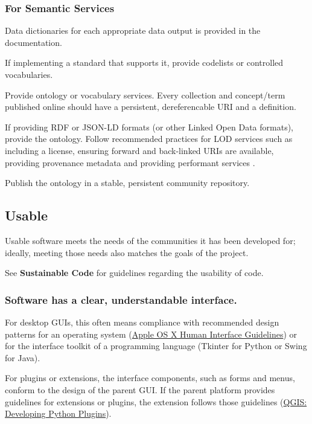 \documentclass{article}
\newcounter{subsubsubsection}[subsubsection]
\begin{document}
\subsubsection{For Semantic Services}
Data dictionaries for each appropriate data output is provided in the documentation.
 
If implementing a standard that supports it, provide codelists or controlled vocabularies.
 
Provide ontology or vocabulary services. Every collection and concept/term published online should have a persistent, dereferencable URI and a definition.
 
If providing RDF or JSON-LD formats (or other Linked Open Data formats), provide the ontology. Follow recommended practices for LOD services such as including a license, ensuring forward and back-linked URIs are available, providing provenance metadata and providing performant services \autocite{zaveri_quality_2015}.
 
Publish the ontology in a stable, persistent community repository.

\subsection{Usable}
Usable software meets the needs of the communities it has been developed for; ideally, meeting those needs also matches the goals of the project. 
 
See \textbf{Sustainable Code} for guidelines regarding the usability of code.

\subsubsection{Software has a clear, understandable interface.}
For desktop GUIs, this often means compliance with recommended design patterns for an operating system (\href{https://developer.apple.com/library/mac/documentation/UserExperience/Conceptual/OSXHIGuidelines/} {Apple OS X Human Interface Guidelines}) or for the interface toolkit of a programming language (Tkinter for Python or Swing for Java). 
 
For plugins or extensions, the interface components, such as forms and menus, conform to the design of the parent GUI. If the parent platform provides guidelines for extensions or plugins, the extension follows those guidelines (\href{http://docs.qgis.org/testing/en/docs/pyqgis_developer_cookbook/plugins.html} {QGIS: Developing Python Plugins}). 
 
\end{document}
